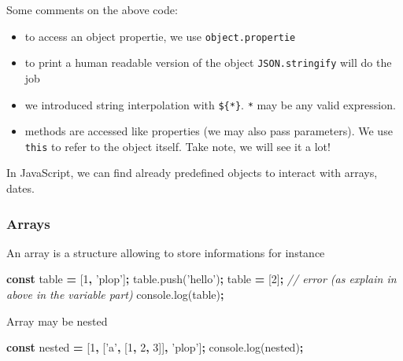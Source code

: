 \documentclass[
]{book}
\newenvironment{Shaded}{\begin{snugshade}}{\end{snugshade}}
\newcommand{\AttributeTok}[1]{\textcolor[rgb]{0.77,0.63,0.00}{#1}}
\newcommand{\CommentTok}[1]{\textcolor[rgb]{0.56,0.35,0.01}{\textit{#1}}}
\newcommand{\DecValTok}[1]{\textcolor[rgb]{0.00,0.00,0.81}{#1}}
\newcommand{\KeywordTok}[1]{\textcolor[rgb]{0.13,0.29,0.53}{\textbf{#1}}}
\newcommand{\NormalTok}[1]{#1}
\newcommand{\OperatorTok}[1]{\textcolor[rgb]{0.81,0.36,0.00}{\textbf{#1}}}
\newcommand{\StringTok}[1]{\textcolor[rgb]{0.31,0.60,0.02}{#1}}
\newcommand{\VariableTok}[1]{\textcolor[rgb]{0.00,0.00,0.00}{#1}}
\providecommand{\tightlist}{%
  \setlength{\itemsep}{0pt}\setlength{\parskip}{0pt}}
\begin{document}
Some comments on the above code:

\begin{itemize}
\tightlist
\item
  to access an object propertie, we use \texttt{object.propertie}
\item
  to print a human readable version of the object \texttt{JSON.stringify} will do the job
\item
  we introduced string interpolation with \texttt{\$\{*\}}. \texttt{*} may be any valid expression.
\item
  methods are accessed like properties (we may also pass parameters). We use \texttt{this} to refer to the object itself. Take note, we will see it a lot!
\end{itemize}

In JavaScript, we can find already predefined objects to interact with arrays, dates.

\hypertarget{arrays}{%
\subsubsection{Arrays}\label{arrays}}

An array is a structure allowing to store informations for instance

\begin{Shaded}
\begin{Highlighting}[]
\KeywordTok{const}\NormalTok{ table }\OperatorTok{=}\NormalTok{ [}\DecValTok{1}\OperatorTok{,} \StringTok{'plop'}\NormalTok{]}\OperatorTok{;}
\VariableTok{table}\NormalTok{.}\AttributeTok{push}\NormalTok{(}\StringTok{'hello'}\NormalTok{)}\OperatorTok{;}
\NormalTok{table }\OperatorTok{=}\NormalTok{ [}\DecValTok{2}\NormalTok{]}\OperatorTok{;} \CommentTok{// error (as explain in above in the variable part)}
\VariableTok{console}\NormalTok{.}\AttributeTok{log}\NormalTok{(table)}\OperatorTok{;}
\end{Highlighting}
\end{Shaded}

Array may be nested

\begin{Shaded}
\begin{Highlighting}[]
\KeywordTok{const}\NormalTok{ nested }\OperatorTok{=}\NormalTok{ [}\DecValTok{1}\OperatorTok{,}\NormalTok{ [}\StringTok{'a'}\OperatorTok{,}\NormalTok{ [}\DecValTok{1}\OperatorTok{,} \DecValTok{2}\OperatorTok{,} \DecValTok{3}\NormalTok{]]}\OperatorTok{,} \StringTok{'plop'}\NormalTok{]}\OperatorTok{;}
\VariableTok{console}\NormalTok{.}\AttributeTok{log}\NormalTok{(nested)}\OperatorTok{;}
\end{Highlighting}
\end{Shaded}
\end{document}
